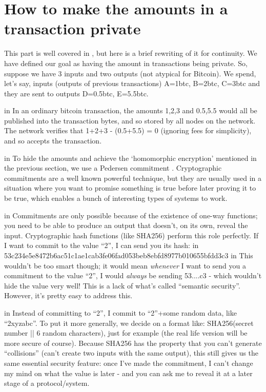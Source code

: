 \documentclass[10pt,a4paper]{article}
\begin{document}
\section{How to make the amounts in a transaction private}

This part is well covered in \cite{ct_wu}, but here is a brief rewriting of it for continuity. We have defined our goal as having the amount in transactions being private. So, suppose we have 3 inputs and two outputs (not atypical for Bitcoin). We spend, let's say, inputs (outputs of previous transactions) A=1btc, B=2btc, C=3btc and they are sent to outputs D=0.5btc, E=5.5btc.

 in \noindent In an ordinary bitcoin transaction, the amounts 1,2,3 and 0.5,5.5 would all be published into the transaction bytes, and so stored by all nodes on the network. The network verifies that 1+2+3 - (0.5+5.5) = 0 (ignoring fees for simplicity), and so accepts the transaction.

 in \noindent  To hide the amounts and achieve the `homomorphic encryption' mentioned in the previous section, we use a Pedersen commitment \cite{pedersen}. Cryptographic commitments are a well known powerful technique, but they are usually used in a situation where you want to promise something is true before later proving it to be true, which enables a bunch of interesting types of systems to work.

 in \noindent  Commitments are only possible because of the existence of one-way functions; you need to be able to produce an output that doesn't, on its own, reveal the input. Cryptographic hash functions (like SHA256) perform this role perfectly. If I want to commit to the value ``2'', I can send you its hash:
 in \noindent  53c234e5e8472b6ac51c1ae1cab3fe06fad053beb8ebfd8977b010655bfdd3c3
 in \noindent  This wouldn't be too smart though; it would mean \textit{whenever} I want to send you a commitment to the value ``2'', I would \textit{always} be sending 53....c3 - which wouldn't hide the value very well! This is a lack of what's called ``semantic security''. However, it's pretty easy to address this.

 in \noindent Instead of committing to ``2'', I commit to ``2''+some random data, like ``2xyzabc''. To put it more generally, we decide on a format like: SHA256(secret number || 6 random characters), just for example (the real life version will be more secure of course). Because SHA256 has the property that you can't generate ``collisions'' (can't create two inputs with the same output), this still gives us the same essential security feature: once I've made the commitment, I can't change my mind on what the value is later - and you can ask me to reveal it at a later stage of a protocol/system.
\end{document}
